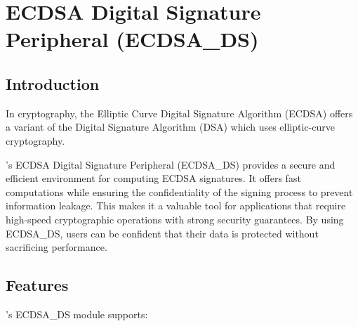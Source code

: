 \documentclass[main\_\_EN.tex]{subfiles}
\begin{document}
\setenglishformatting

\ifglobal
\else
    \clearpage
    \listoftodos
    \listofdonetodos
    \tableofcontents
\fi



\hypertarget{ecdsa}{}
\chapter{ECDSA Digital Signature Peripheral (ECDSA\_DS)}
\label{mod:ecdsa}


\section{Introduction}

In cryptography, the Elliptic Curve Digital Signature Algorithm (ECDSA) offers a variant of the Digital Signature Algorithm (DSA) which uses elliptic-curve cryptography.

\chipname{}'s ECDSA Digital Signature Peripheral (ECDSA\_DS) provides a secure and efficient environment for computing ECDSA signatures. It offers fast computations while ensuring the confidentiality of the signing process to prevent information leakage. This makes it a valuable tool for applications that require high-speed cryptographic operations with strong security guarantees. By using ECDSA\_DS, users can be confident that their data is protected without sacrificing performance.



\section{Features}
\label{sec:ecdsa-features}

\chipname{}'s ECDSA\_DS module supports:
\end{document}
